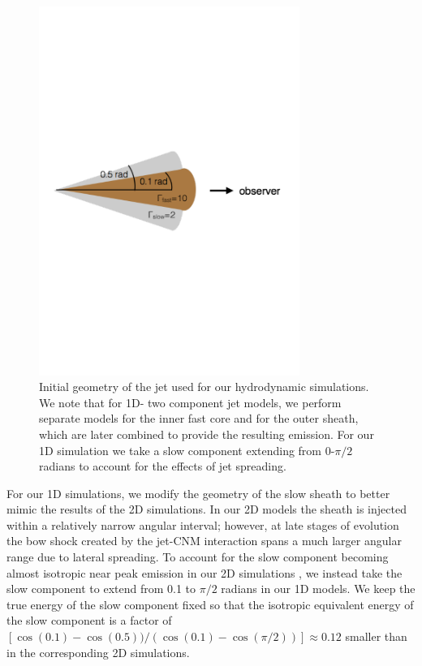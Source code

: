 \documentclass[usenatbib,fleqn]{mnras}
\begin{document}
\begin{figure}

\includegraphics[width=8.5cm]{jetstruct.pdf}
\caption{\label{fig:jetstruct} Initial geometry of the jet used for
  our hydrodynamic simulations. We note that for 1D- two component jet
  models, we perform separate models for the inner fast core and for
  the outer sheath, which are later combined to provide the resulting
  emission. For our 1D simulation we take a slow component
  extending from 0-$\pi/2$ radians to account for the effects of jet
  spreading.}
\end{figure}

For our 1D simulations, we modify the geometry of the slow sheath to
better mimic the results of the 2D simulations.  In our 2D models the
sheath is injected within a relatively narrow angular interval;
however, at late stages of evolution the bow shock created by the
jet-CNM interaction spans a much larger angular range due to lateral
spreading.  To account for the slow component becoming almost
isotropic near peak emission in our 2D simulations \citep[bottom two
panels of Fig.~8 in][]{Mimica+2015}, we instead take the slow
component to extend from 0.1 to $\pi/2$ radians in our 1D models. We
keep the true energy of the slow component fixed so that the isotropic
equivalent energy of the slow component is a factor of
$[\cos(0.1)-\cos(0.5))/(\cos(0.1)-\cos(\pi/2))]\approx 0.12$ smaller
than in the corresponding 2D simulations.
\end{document}
